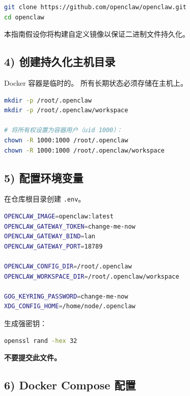 \begin{lstlisting}[language=bash]
git clone https://github.com/openclaw/openclaw.git
cd openclaw
\end{lstlisting}


本指南假设你将构建自定义镜像以保证二进制文件持久化。

\hrulefill


\subsection{4) 创建持久化主机目录}


Docker 容器是临时的。
所有长期状态必须存储在主机上。

\begin{lstlisting}[language=bash]
mkdir -p /root/.openclaw
mkdir -p /root/.openclaw/workspace

# 将所有权设置为容器用户（uid 1000）：
chown -R 1000:1000 /root/.openclaw
chown -R 1000:1000 /root/.openclaw/workspace
\end{lstlisting}


\hrulefill


\subsection{5) 配置环境变量}


在仓库根目录创建 \texttt{.env}。

\begin{lstlisting}[language=bash]
OPENCLAW_IMAGE=openclaw:latest
OPENCLAW_GATEWAY_TOKEN=change-me-now
OPENCLAW_GATEWAY_BIND=lan
OPENCLAW_GATEWAY_PORT=18789

OPENCLAW_CONFIG_DIR=/root/.openclaw
OPENCLAW_WORKSPACE_DIR=/root/.openclaw/workspace

GOG_KEYRING_PASSWORD=change-me-now
XDG_CONFIG_HOME=/home/node/.openclaw
\end{lstlisting}


生成强密钥：

\begin{lstlisting}[language=bash]
openssl rand -hex 32
\end{lstlisting}


\textbf{不要提交此文件。}

\hrulefill


\subsection{6) Docker Compose 配置}


